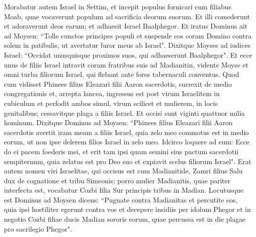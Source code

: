 \begin{biblechapter}  
\verse Morabatur autem Israel in Settim, et incepit populus fornicari cum filiabus Moab, 
\verse quae vocaverunt populum ad sacrificia deorum suorum. Et illi comederunt et adoraverunt deos earum; 
\verse et adhaesit Israel Baalphegor. Et iratus Dominus 
\verse ait ad Moysen: “Tolle cunctos principes populi et suspende eos coram Domino contra solem in patibulis, ut avertatur furor meus ab Israel". 
\verse Dixitque Moyses ad iudices Israel: “Occidat unusquisque proximos suos, qui adhaeserunt Baalphegor". 
\verse Et ecce unus de filiis Israel intravit coram fratribus suis ad Madianitin, vidente Moyse et omni turba filiorum Israel, qui flebant ante fores tabernaculi conventus. 
\verse Quod cum vidisset Phinees filius Eleazari filii Aaron sacerdotis, surrexit de medio congregationis et, arrepta lancea, 
\verse ingressus est post virum Israelitem in cubiculum et perfodit ambos simul, virum scilicet et mulierem, in locis genitalibus; cessavitque plaga a filiis Israel. 
\verse Et occisi sunt viginti quattuor milia hominum. 
\verse Dixitque Dominus ad Moysen: 
\verse “Phinees filius Eleazari filii Aaron sacerdotis avertit iram meam a filiis Israel, quia zelo meo commotus est in medio eorum, ut non ipse delerem filios Israel in zelo meo. 
\verse Idcirco loquere ad eum: Ecce do ei pacem foederis mei, 
\verse et erit tam ipsi quam semini eius pactum sacerdotii sempiternum, quia zelatus est pro Deo suo et expiavit scelus filiorum Israel". 
\verse Erat autem nomen viri Israelitae, qui occisus est cum Madianitide, Zamri filius Salu dux de cognatione et tribu Simeonis; 
\verse porro mulier Madianitis, quae pariter interfecta est, vocabatur Cozbi filia Sur principis tribus in Madian. 
\verse Locutusque est Dominus ad Moysen dicens: 
\verse “Pugnate contra Madianitas et percutite eos, 
\verse quia ipsi hostiliter egerunt contra vos et decepere insidiis per idolum Phegor et in negotio Cozbi filiae ducis Madian sororis eorum, quae percussa est in die plagae pro sacrilegio Phegor". 
\end{biblechapter}

